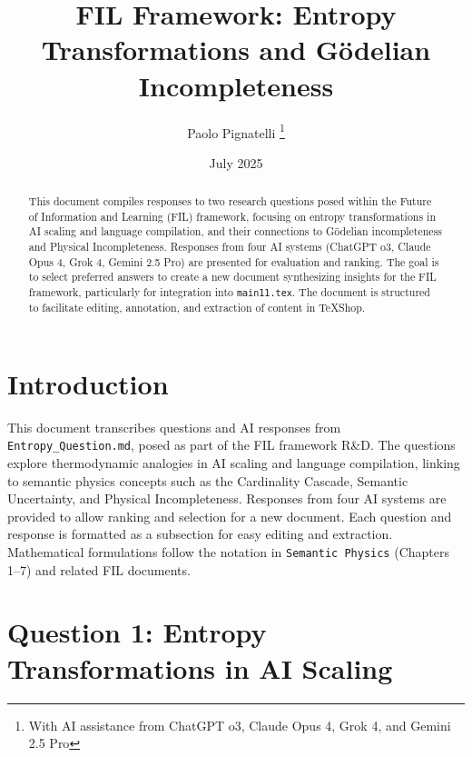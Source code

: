 \documentclass[11pt,letterpaper]{article}
\title{FIL Framework: Entropy Transformations and Gödelian Incompleteness}
\author{Paolo Pignatelli \thanks{With AI assistance from ChatGPT o3, Claude Opus 4, Grok 4, and Gemini 2.5 Pro}}
\date{July 2025}
\begin{document}
\maketitle

\begin{abstract}
This document compiles responses to two research questions posed within the Future of Information and Learning (FIL) framework, focusing on entropy transformations in AI scaling and language compilation, and their connections to Gödelian incompleteness and Physical Incompleteness. Responses from four AI systems (ChatGPT o3, Claude Opus 4, Grok 4, Gemini 2.5 Pro) are presented for evaluation and ranking. The goal is to select preferred answers to create a new document synthesizing insights for the FIL framework, particularly for integration into \texttt{main11.tex}. The document is structured to facilitate editing, annotation, and extraction of content in TeXShop.
\end{abstract}

\section{Introduction}
This document transcribes questions and AI responses from \texttt{Entropy\_Question.md}, posed as part of the FIL framework R\&D. The questions explore thermodynamic analogies in AI scaling and language compilation, linking to semantic physics concepts such as the Cardinality Cascade, Semantic Uncertainty, and Physical Incompleteness. Responses from four AI systems are provided to allow ranking and selection for a new document. Each question and response is formatted as a subsection for easy editing and extraction. Mathematical formulations follow the notation in \texttt{Semantic Physics} (Chapters 1--7) and related FIL documents.


\section{Question 1: Entropy Transformations in AI Scaling}
\label{sec:q1}
\end{document}
